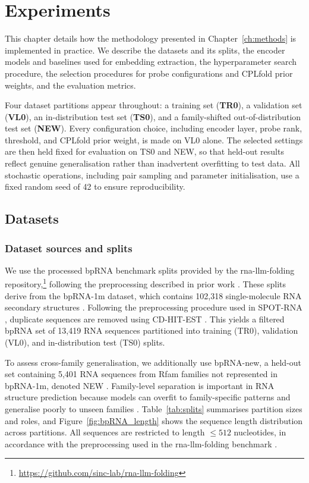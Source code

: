 \documentclass[logo,bsc,singlespacing,parskip]{infthesis}
\begin{document}
\chapter{Experiments}
\label{ch:experiments}
This chapter details how the methodology presented in Chapter~\ref{ch:methods} is implemented in practice. We describe the datasets and its splits, the encoder models and baselines used for embedding extraction, the hyperparameter search procedure, the selection procedures for probe configurations and CPLfold prior weights, and the evaluation metrics.

Four dataset partitions appear throughout: a training set (\textbf{TR0}), a validation set (\textbf{VL0}), an in-distribution test set (\textbf{TS0}), and a family-shifted out-of-distribution test set (\textbf{NEW}). Every configuration choice, including encoder layer, probe rank, threshold, and CPLfold prior weight, is made on VL0 alone. The selected settings are then held fixed for evaluation on TS0 and NEW, so that held-out results reflect genuine generalisation rather than inadvertent overfitting to test data. All stochastic operations, including pair sampling and parameter initialisation, use a fixed random seed of 42 to ensure reproducibility.

\section{Datasets}
\label{sec:exp_data}

\subsection{Dataset sources and splits}
\label{sec:exp_data_splits}
We use the processed bpRNA benchmark splits provided by the
rna-llm-folding repository,\footnote{\url{https://github.com/sinc-lab/rna-llm-folding}}
following the preprocessing described in prior work
\citep{zablocki2025benchmark}. These splits derive from the
bpRNA-1m dataset, which contains 102{,}318 single-molecule RNA
secondary structures \citep{danaee2018bprna}.
Following the preprocessing procedure used in SPOT-RNA  \citep{singh2019rna}, duplicate sequences are removed using
CD-HIT-EST \citep{fu2012cdhit}. This yields a filtered bpRNA set of
13{,}419 RNA sequences partitioned into training (TR0), validation (VL0), and in-distribution test (TS0) splits.

To assess cross-family generalisation, we additionally use bpRNA-new,
a held-out set containing 5{,}401 RNA sequences from Rfam families not
represented in bpRNA-1m, denoted NEW
\citep{kalvari2017rfam,sato2021mxfold2}. Family-level separation is important in RNA structure prediction because models can overfit to family-specific patterns and generalise poorly to unseen families \citep{szikszai2022}. Table~\ref{tab:splits}
summarises partition sizes and roles, and
Figure~\ref{fig:bpRNA_length} shows the sequence length
distribution across partitions. All sequences are restricted to length \(\leq 512\) nucleotides, in
accordance with the preprocessing used in the rna-llm-folding
benchmark \citep{zablocki2025benchmark}.
\end{document}
